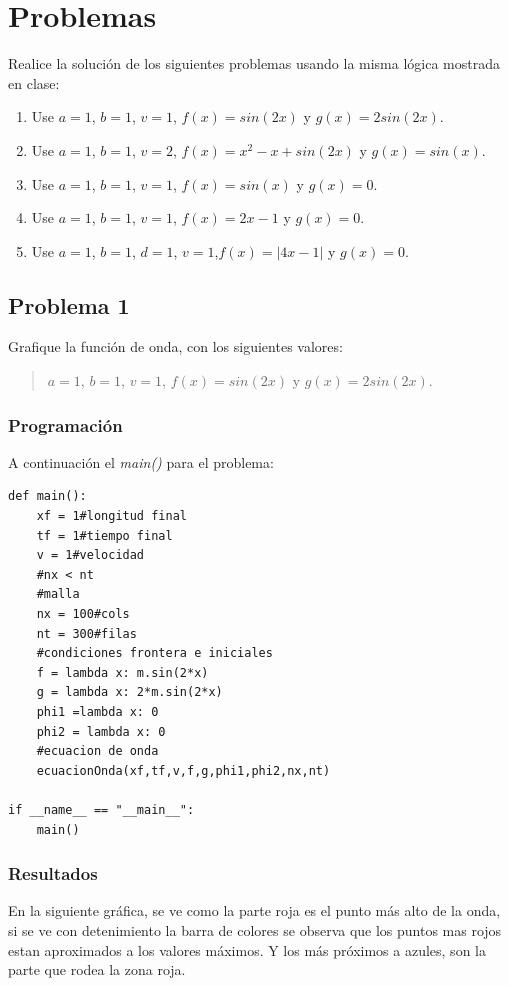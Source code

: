 \documentclass[a4paper,12pt]{article}
\newcommand{\eq}[1]{$#1$}
\begin{document}
    \section{Problemas}
    Realice la solución de los siguientes problemas usando la 
    misma lógica mostrada en clase:
    \begin{enumerate}
        \item Use \eq{a = 1}, \eq{b = 1}, \eq{v = 1}, \eq{f(x) = sin(2x)} y \eq{g(x) = 2sin(2x)}.
        \item Use \eq{a = 1}, \eq{b = 1}, \eq{v = 2}, \eq{f(x) = x^2 - x + sin(2x)} y \eq{g(x) = sin(x)}.
        \item Use \eq{a = 1}, \eq{b = 1}, \eq{v = 1}, \eq{f(x) = sin(x)} y \eq{g(x) = 0}.
        \item Use \eq{a = 1}, \eq{b = 1}, \eq{v = 1}, \eq{f(x) = 2x - 1} y \eq{g(x) = 0}.
        \item Use \eq{a = 1}, \eq{b = 1}, \eq{d = 1}, \eq{v = 1},\eq{f(x) = |4x - 1|} y \eq{g(x) = 0}.
    \end{enumerate}

    \subsection{Problema 1}
    Grafique la función de onda, con los siguientes valores:
    \begin{quote}
        \centering
        \eq{a = 1}, \eq{b = 1}, \eq{v = 1}, \eq{f(x) = sin(2x)} y \eq{g(x) = 2sin(2x)}.
    \end{quote}
    \subsubsection{Programación}
    A continuación el \emph{main()} para el problema:
\begin{lstlisting}[frame=single]
def main():
    xf = 1#longitud final
    tf = 1#tiempo final
    v = 1#velocidad 
    #nx < nt
    #malla
    nx = 100#cols
    nt = 300#filas
    #condiciones frontera e iniciales
    f = lambda x: m.sin(2*x)
    g = lambda x: 2*m.sin(2*x)
    phi1 =lambda x: 0
    phi2 = lambda x: 0
    #ecuacion de onda
    ecuacionOnda(xf,tf,v,f,g,phi1,phi2,nx,nt)

if __name__ == "__main__":
    main()
\end{lstlisting}
    \subsubsection{Resultados}
    En la siguiente gráfica, se ve como la parte roja es el punto más 
    alto de la onda, si se ve con detenimiento la barra de colores
    se observa que los puntos mas rojos estan aproximados a los valores máximos.
    Y los más próximos a azules, son la parte que rodea la zona roja.
    
\end{document}
